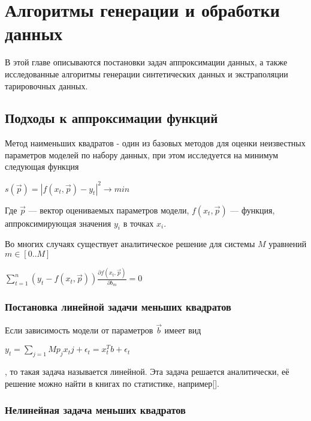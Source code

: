 \chapter{Алгоритмы генерации и обработки данных} \label{chapt2}

В этой главе описываются постановки задач аппроксимации данных, а также исследованные алгоритмы генерации 
синтетических данных и
экстраполяции тарировочных данных. 


\section{Подходы к аппроксимации функций}\label{sect2_1}
Метод наименьших квадратов - один из базовых методов для оценки неизвестных 
параметров моделей по набору данных, при этом исследуется на минимум 
следующая функция


\begin{center}
 $ s(\vec{p}) = \left| f(x_t, \vec{p}) - y_t \right| ^ 2 \rightarrow min $
\end{center}


Где $\vec{p}$ --- вектор оцениваемых параметров модели, $f(x_t, \vec{p}) $
--- функция, аппроксимирующая значения $y_i$ в точках $x_i$.

Во многих случаях существует аналитическое решение для системы $M$ уравнений 
$m \in [0..M]$
\begin{center}
 $ \displaystyle\sum_{t = 1}^n \left( y_t - f(x_t,\vec{p})\right) 
 \frac{\partial f(x_t, \vec{p})}{\partial b_m} = 0 $
\end{center}

\subsection{Постановка линейной задачи меньших квадратов}

Если зависимость модели от параметров $\vec{b}$ имеет вид 

\begin{center}
$ y_t = \displaystyle\sum_{j=1}{M}p_j x_tj + \epsilon_t = 
x^T_tb + \epsilon_t$ 
\end{center}
, то такая задача называется линейной. Эта задача решается аналитически, 
её решение можно найти в книгах по статистике, например[].



\subsection{Нелинейная задача меньших квадратов}


